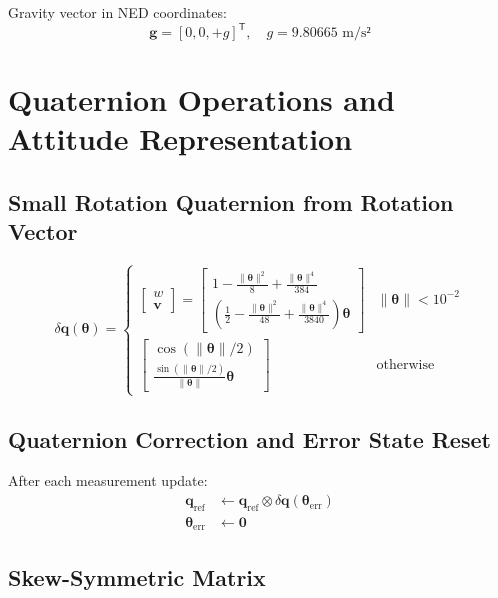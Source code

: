 \documentclass{article}
\newcommand{\vect}[1]{\bm{#1}}
\newcommand{\quat}[1]{\mathbf{#1}}
\newcommand{\T}{\mathsf{T}}
\begin{document}
Gravity vector in NED coordinates:
\begin{equation}
\vect{g} = [0, 0, +g]^\T, \quad g = 9.80665 \text{ m/s²}
\end{equation}

\section{Quaternion Operations and Attitude Representation}

\subsection{Small Rotation Quaternion from Rotation Vector}

\begin{equation}
\delta\quat{q}(\vect{\theta}) = 
\begin{cases}
\begin{bmatrix}
w \\
\vect{v}
\end{bmatrix}
=
\begin{bmatrix}
1 - \frac{\|\vect{\theta}\|^2}{8} + \frac{\|\vect{\theta}\|^4}{384} \\
\left(\frac{1}{2} - \frac{\|\vect{\theta}\|^2}{48} + \frac{\|\vect{\theta}\|^4}{3840}\right) \vect{\theta}
\end{bmatrix}
& \|\vect{\theta}\| < 10^{-2} \\
\begin{bmatrix}
\cos(\|\vect{\theta}\|/2) \\
\frac{\sin(\|\vect{\theta}\|/2)}{\|\vect{\theta}\|} \vect{\theta}
\end{bmatrix}
& \text{otherwise}
\end{cases}
\end{equation}

\subsection{Quaternion Correction and Error State Reset}

After each measurement update:
\begin{align}
\quat{q}_{\text{ref}} &\leftarrow \quat{q}_{\text{ref}} \otimes \delta\quat{q}(\vect{\theta}_{\text{err}}) \\
\vect{\theta}_{\text{err}} &\leftarrow \vect{0}
\end{align}

\subsection{Skew-Symmetric Matrix}
\end{document}
